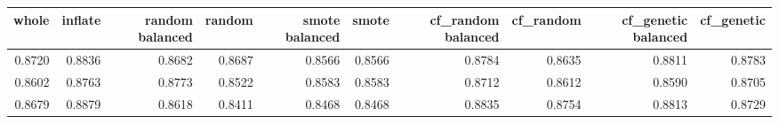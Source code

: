 \begin{tabular}{rrrrrrrrrr}
\toprule

 whole &  inflate &  random balanced &  random &  smote balanced &  smote &  cf\_random balanced &  cf\_random &  cf\_genetic balanced &  cf\_genetic \\
\midrule

0.8720 &   0.8836 &           0.8682 &  0.8687 &          0.8566 & 0.8566 &              0.8784 &     0.8635 &               0.8811 &      0.8783 \\
0.8602 &   0.8763 &           0.8773 &  0.8522 &          0.8583 & 0.8583 &              0.8712 &     0.8612 &               0.8590 &      0.8705 \\
0.8679 &   0.8879 &           0.8618 &  0.8411 &          0.8468 & 0.8468 &              0.8835 &     0.8754 &               0.8813 &      0.8729 \\

\bottomrule
\end{tabular}
